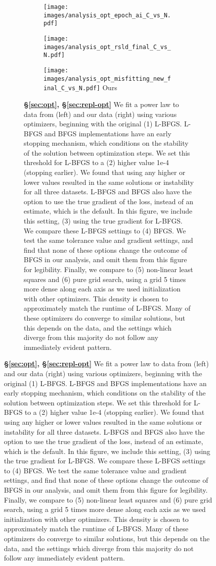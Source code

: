 \begin{figure}[]
\ContinuedFloat
\centering 


\begin{subfigure}{\textwidth}
\begin{subfigure}{0.49\textwidth}
    \centering
    \texttt{[image: images/analysis\_opt\_epoch\_ai\_C\_vs\_N.pdf]}
    \footnotesize{\citet{hoffmann2022training,besiroglu2024chinchilla}}
    \label{fig:analysis_opt_epoch}
\end{subfigure}
\hfill
\begin{subfigure}{0.49\textwidth}
    \centering
    \texttt{[image: images/analysis\_opt\_rsld\_final\_C\_vs\_N.pdf]}
    \footnotesize{\citet{porian2024resolving}}
    \label{fig:analysis_opt_ours}
\end{subfigure}
\vspace{1em}
    \centering
\begin{subfigure}{0.49\textwidth}
    \centering
    \texttt{[image: images/analysis\_opt\_misfitting\_new\_final\_C\_vs\_N.pdf]}
    \footnotesize{Ours}
    \label{fig:analysis_opt_ours}
\end{subfigure}
\caption{\textbf{\S\ref{sec:opt}, \S\ref{sec:repl-opt}} We fit a power law to data from \citet{besiroglu2024chinchilla} (left) and our data (right) using various optimizers, beginning with the original (1) L-BFGS. L-BFGS and BFGS implementations have an early stopping mechanism, which conditions on the stability of the solution between optimization steps. We set this threshold for L-BFGS to a (2) higher value 1e-4 (stopping earlier).
We found that using any higher or lower values resulted in the same solutions or instability for all three datasets. L-BFGS and BFGS also have the option to use the true gradient of the loss, instead of an estimate, which is the default. In this figure, we include this setting, (3) using the true gradient for L-BFGS. We compare these L-BFGS settings to (4) BFGS. We test the same tolerance value and gradient settings, and find that none of these options change the outcome of BFGS in our analysis, and omit them from this figure for legibility. Finally, we compare to (5) non-linear least squares and (6) pure grid search, using a grid 5 times more dense along each axis as we used initialization with other optimizers. This density is chosen to approximately match the runtime of L-BFGS.
Many of these optimizers do converge to similar solutions, but this depends on the data, and the settings which diverge from this majority do not follow any immediately evident pattern.} 
\label{fig:analysis_opt}

\end{subfigure}

\end{figure}
